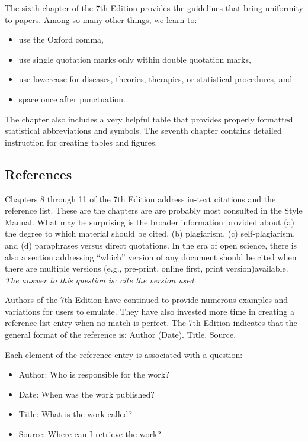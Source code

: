 \documentclass[
  11pt,
]{book}
\providecommand{\tightlist}{%
  \setlength{\itemsep}{0pt}\setlength{\parskip}{0pt}}
\begin{document}
The sixth chapter of the 7th Edition provides the guidelines that bring uniformity to papers. Among so many other things, we learn to:

\begin{itemize}
\tightlist
\item
  use the Oxford comma,
\item
  use single quotation marks only within double quotation marks,
\item
  use lowercase for diseases, theories, therapies, or statistical procedures, and
\item
  space once after punctuation.
\end{itemize}

The chapter also includes a very helpful table that provides properly formatted statistical abbreviations and symbols. The seventh chapter contains detailed instruction for creating tables and figures.

\hypertarget{references-2}{%
\subsection{References}\label{references-2}}

Chapters 8 through 11 of the 7th Edition address in-text citations and the reference list. These are the chapters are are probably most consulted in the Style Manual. What may be surprising is the broader information provided about (a) the degree to which material should be cited, (b) plagiarism, (c) self-plagiarism, and (d) paraphrases versus direct quotations. In the era of open science, there is also a section addressing ``which'' version of any document should be cited when there are multiple versions (e.g., pre-print, online first, print version)available. \emph{The answer to this question is: cite the version used.}

Authors of the 7th Edition have continued to provide numerous examples and variations for users to emulate. They have also invested more time in creating a reference list entry when no match is perfect. The 7th Edition indicates that the general format of the reference is: Author (Date). Title. Source.

Each element of the reference entry is associated with a question:

\begin{itemize}
\tightlist
\item
  Author: Who is responsible for the work?
\item
  Date: When was the work published?
\item
  Title: What is the work called?
\item
  Source: Where can I retrieve the work?
\end{itemize}
\end{document}
